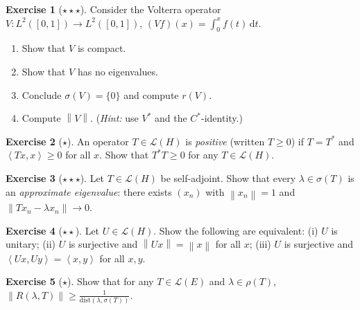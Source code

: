 \documentclass[a4paper,12pt]{book}
\newcommand{\dd}{\mathrm{d}}
\newcommand{\norm}[1]{\left\| #1 \right\|}
\newcommand{\inner}[2]{\left\langle #1, #2 \right\rangle}
\theoremstyle{definition}
\newtheorem{exercise}{Exercise}[chapter]
\theoremstyle{plain}
\theoremstyle{remark}
\begin{document}
\begin{exercise}[$\star\star\star$]\label{exo:volterra-spectrum}
Consider the Volterra operator
$V\colon L^2([0,1])\to L^2([0,1])$, $(Vf)(x)=\int_0^x f(t)\,\dd t$.
\begin{enumerate}[label=(\alph*)]
  \item Show that $V$ is compact.
  \item Show that $V$ has no eigenvalues.
  \item Conclude $\sigma(V)=\{0\}$ and compute $r(V)$.
  \item Compute $\norm{V}$. (\emph{Hint:} use $V^*$ and the $C^*$-identity.)
\end{enumerate}
\end{exercise}

\begin{exercise}[$\star$]\label{exo:self-adj-positive}
An operator $T\in\mathcal{L}(H)$ is \emph{positive} (written $T\geq 0$) if
$T=T^*$ and $\inner{Tx}{x}\geq 0$ for all $x$. Show that $T^*T\geq 0$ for
any $T\in\mathcal{L}(H)$.
\end{exercise}

\begin{exercise}[$\star\star\star$]\label{exo:approximate-eigenvalue}
Let $T\in\mathcal{L}(H)$ be self-adjoint. Show that every
$\lambda\in\sigma(T)$ is an \emph{approximate eigenvalue}: there exists
$(x_n)$ with $\norm{x_n}=1$ and $\norm{Tx_n-\lambda x_n}\to 0$.
\end{exercise}

\begin{exercise}[$\star\star$]\label{exo:unitary-char}
Let $U\in\mathcal{L}(H)$. Show the following are equivalent:
(i) $U$ is unitary;
(ii) $U$ is surjective and $\norm{Ux}=\norm{x}$ for all $x$;
(iii) $U$ is surjective and $\inner{Ux}{Uy}=\inner{x}{y}$ for all $x,y$.
\end{exercise}

\begin{exercise}[$\star$]\label{exo:resolvent-bound}
Show that for any $T\in\mathcal{L}(E)$ and $\lambda\in\rho(T)$,
$\norm{R(\lambda,T)}\geq\frac{1}{\mathrm{dist}(\lambda,\sigma(T))}$.
\end{exercise}
\end{document}

